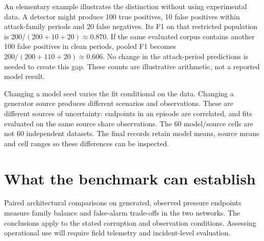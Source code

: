 An elementary example illustrates the distinction without using experimental data. A detector might produce 100 true positives, 10 false positives within attack-family periods and 20 false negatives. Its F1 on that restricted population is $200/(200+10+20)\approx0.870$. If the same evaluated corpus contains another 100 false positives in clean periods, pooled F1 becomes $200/(200+110+20)\approx0.606$. No change in the attack-period predictions is needed to create this gap. These counts are illustrative arithmetic, not a reported model result.

Changing a model seed varies the fit conditional on the data. Changing a generator source produces different scenarios and observations. These are different sources of uncertainty: endpoints in an episode are correlated, and fits evaluated on the same source share observations. The 60 model/source cells are not 60 independent datasets. The final records retain model means, source means and cell ranges so these differences can be inspected.

\section{What the benchmark can establish}
Paired architectural comparisons on generated, observed pressure endpoints measure family balance and false-alarm trade-offs in the two networks. The conclusions apply to the stated corruption and observation conditions. Assessing operational use will require field telemetry and incident-level evaluation.
